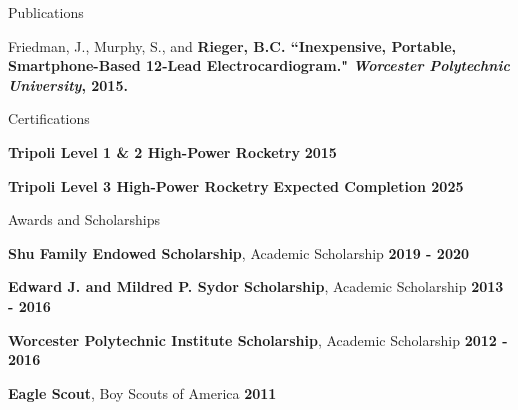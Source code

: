 \documentclass{resume} %
\begin{document}
	
	\begin{rSection}{Publications}							
		\item Friedman, J., Murphy, S., and \bf Rieger, B.C. \normalfont ``Inexpensive, Portable, Smartphone-Based 12-Lead Electrocardiogram." \textit{Worcester Polytechnic University}, 2015.							
	\end{rSection}
	
	\begin{rSection}{Certifications}						
		\item \textbf{Tripoli Level 1 \& 2 High-Power Rocketry} \hfill{\bf 2015}
		\item \textbf{Tripoli Level 3 High-Power Rocketry} \hfill{\bf Expected Completion 2025}							
	\end{rSection}
	
	\begin{rSection}{Awards and Scholarships} \itemsep -2pt						
		\item \textbf{Shu Family Endowed Scholarship}, Academic Scholarship \hfill{\bf 2019 - 2020}
		\item \textbf{Edward J. and Mildred P. Sydor Scholarship}, Academic Scholarship \hfill{\bf 2013 - 2016}
		\item \textbf{Worcester Polytechnic Institute Scholarship}, Academic Scholarship \hfill{\bf 2012 - 2016}
		\item \textbf{Eagle Scout}, Boy Scouts of America \hfill{\bf 2011}							
	\end{rSection}
	
\end{document}
